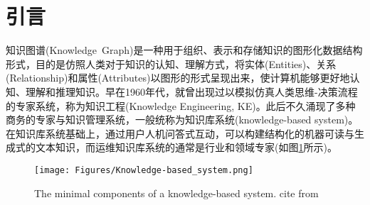 \section{引言}
知识图谱\textrm{(Knowledge~Graph)}是一种用于组织、表示和存储知识的图形化数据结构形式，目的是仿照人类对于知识的认知、理解方式，将实体\textrm{(Entities)}、关系\textrm{(Relationship)}和属性\textrm{(Attributes)}以图形的形式呈现出来，使计算机能够更好地认知、理解和推理知识。早在1960年代，就曾出现过以模拟仿真人类思维-决策流程的专家系统，称为知识工程\textrm{(Knowledge Engineering, KE)}。此后不久涌现了多种商务的专家与知识管理系统，一般统称为知识库系统\textrm{(knowledge-based system)}。在知识库系统基础上，通过用户人机问答式互动，可以构建结构化的机器可读与生成式的文本知识，而运维知识库系统的通常是行业和领域专家(如图\ref{Fig:Knowledge-based_system}所示)。
\begin{figure}[h!]
\centering
\texttt{[image: Figures/Knowledge-based\_system.png]}
\caption{\small\textrm{The minimal components of a knowledge-based system. cite from\cite{ACR56-128_2023}}}%
\label{Fig:Knowledge-based_system}
\end{figure}

